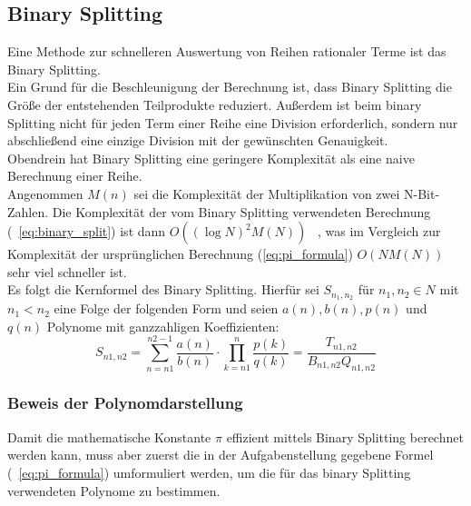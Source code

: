 \documentclass[course=erap]{aspdoc}
\begin{document}
\subsection{Binary Splitting}
Eine Methode zur schnelleren Auswertung von Reihen rationaler Terme ist das Binary Splitting.\\ 
Ein Grund für die Beschleunigung der Berechnung ist, dass Binary Splitting die Größe der entstehenden Teilprodukte reduziert. Außerdem ist beim binary Splitting nicht für jeden Term einer Reihe eine Division erforderlich, sondern nur abschließend eine einzige Division mit der gewünschten Genauigkeit.\\
Obendrein hat Binary Splitting eine geringere Komplexität als eine naive Berechnung einer Reihe.\\
Angenommen $M(n)$ sei die Komplexität der Multiplikation von zwei N-Bit-Zahlen. 
Die Komplexität der vom Binary Splitting verwendeten Berechnung (~\ref{eq:binary_split}) ist dann
$O((\log N)^2 M(N))$ ~\cite{splitspeed}, was im Vergleich zur Komplexität der ursprünglichen 
Berechnung (\ref{eq:pi_formula}) $O(NM(N))$ sehr viel schneller ist.
\\

Es folgt die Kernformel des Binary Splitting. Hierfür sei $S_{n_1, n_2}$ für $n_1, n_2 \in N$ mit $n_1 < n_2$ eine Folge der folgenden Form und seien $a(n), b(n), p(n)$ und $q(n)$ Polynome mit ganzzahligen Koeffizienten:
\begin{equation}
    S_{n1,n2} = \sum_{n=n1}^{n2 - 1} {\frac{a(n)}{b(n)} \cdot \prod_{k=n1}^{n} {\frac{p(k)}{q(k)}}} = \frac{T_{n1,n2}}{B_{n1,n2}Q_{n1,n2}}
    \label{eq:binary_split} 
\end{equation} 


\subsubsection{Beweis der Polynomdarstellung}
Damit die mathematische Konstante $\pi$ effizient mittels Binary Splitting berechnet werden kann, muss aber zuerst die in der Aufgabenstellung gegebene Formel (~\ref{eq:pi_formula}) umformuliert werden, um die für das binary Splitting verwendeten Polynome zu bestimmen.
\end{document}
